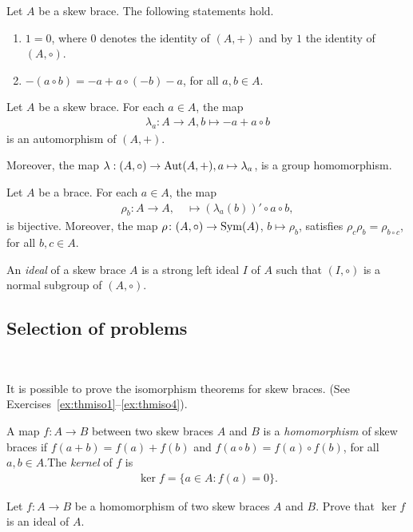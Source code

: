 \begin{fact}
    Let $A$ be a skew brace. The following statements hold.
        \begin{enumerate}
            \item $1=0$, where $0$ denotes the identity of $(A,+)$ and by $1$ the identity of $(A,\circ)$.
            \item $-(a\circ b) = - a + a\circ(- b) - a$, for all $a,b \in A$.
        \end{enumerate}
\end{fact}

    \begin{fact}\label{fact:lambda}
        Let $A$ be a skew brace. For each $a\in A$, the map 
        \begin{align*}
            \lambda_a:A\to A, b\mapsto -a + a \circ b
        \end{align*}
    is an automorphism of $(A,+)$. 
    
    Moreover, the map $\lambda: (A,\circ) \to \operatorname{Aut}(A,+), a \mapsto \lambda_a$, is a group homomorphism.
    \end{fact}



    \begin{fact}\label{fact:rho}
        Let $A$ be a brace. For each $a\in A$, the map
        \begin{align*}
            \rho_b\colon A\to A,\quad
            \mapsto (\lambda_a(b))'\circ a\circ b,
        \end{align*}
        is bijective. Moreover, the map 
        $\rho\colon (A,\circ)\to\operatorname{Sym}(A)$, $b\mapsto\rho_b$, satisfies $\rho_c\rho_b=\rho_{b\circ c}$, for all $b,c\in A$. 
    \end{fact}

    \begin{definition}
        An \emph{ideal} of a skew brace $A$ is a strong left ideal $I$ of $A$ such that    $(I,\circ)$ is a normal subgroup of $(A,\circ)$.
    \end{definition}

\subsection{Selection of problems}\mbox{ }
    
It is possible to prove the isomorphism theorems for skew braces. (See Exercises~\ref{ex:thmiso1}--\ref{ex:thmiso4}).

\begin{exercise}
     A map $f:A\to B$ between two skew braces $A$ and $B$ is a \emph{homomorphism} of skew braces if $f(a + b)= f(a) +f(b)$ and $f(a\circ b)= f(a)\circ f(b)$, for all $a,b\in A$.The \emph{kernel} of $f$ is
    \begin{align*}
        \ker f = \{a\in A\colon f(a)=0\}.
    \end{align*}
    
    Let $f:A\to B$ be a homomorphism of two skew braces $A$ and $B$. 
    Prove that $\ker f$ is an ideal of $A$.
\end{exercise}

